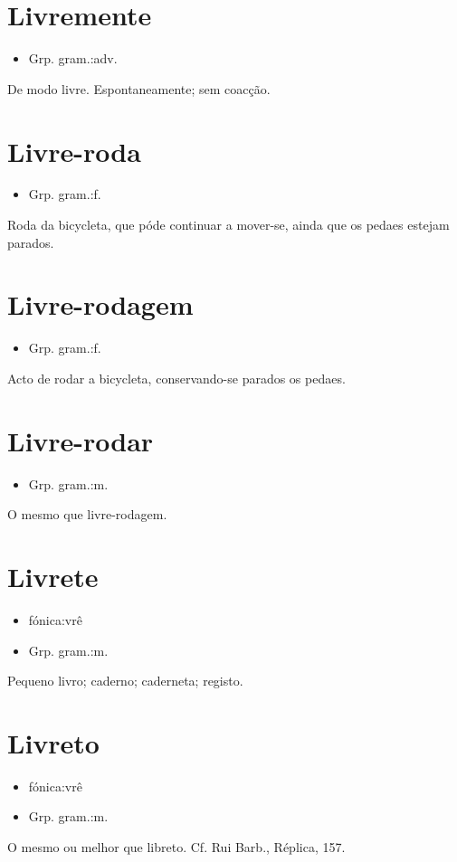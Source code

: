 \section{Livremente}
\begin{itemize}
\item {Grp. gram.:adv.}
\end{itemize}
De modo livre.
Espontaneamente; sem coacção.
\section{Livre-roda}
\begin{itemize}
\item {Grp. gram.:f.}
\end{itemize}
Roda da bicycleta, que póde continuar a mover-se, ainda que os pedaes estejam parados.
\section{Livre-rodagem}
\begin{itemize}
\item {Grp. gram.:f.}
\end{itemize}
Acto de rodar a bicycleta, conservando-se parados os pedaes.
\section{Livre-rodar}
\begin{itemize}
\item {Grp. gram.:m.}
\end{itemize}
O mesmo que \textunderscore livre-rodagem\textunderscore .
\section{Livrete}
\begin{itemize}
\item {fónica:vrê}
\end{itemize}
\begin{itemize}
\item {Grp. gram.:m.}
\end{itemize}
Pequeno livro; caderno; caderneta; registo.
\section{Livreto}
\begin{itemize}
\item {fónica:vrê}
\end{itemize}
\begin{itemize}
\item {Grp. gram.:m.}
\end{itemize}
O mesmo ou melhor que \textunderscore libreto\textunderscore . Cf. Rui Barb., \textunderscore Réplica\textunderscore , 157.
